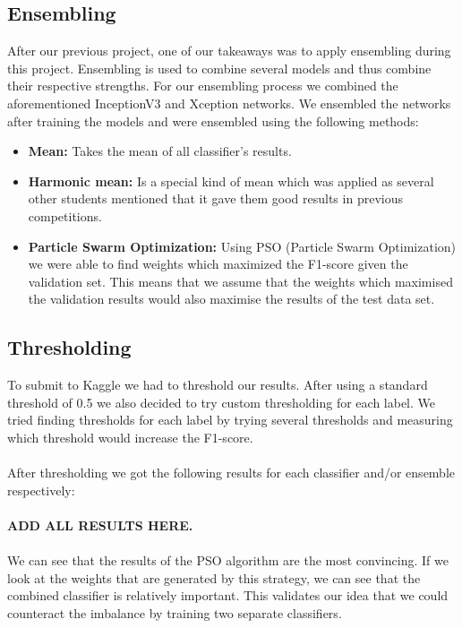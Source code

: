\documentclass[10pt, a4paper]{article}
\begin{document}
\begin{multicols}{2}
		\subsection{Ensembling}
		After our previous project, one of our takeaways was to apply ensembling during this project. Ensembling is used to combine several models and thus combine their respective strengths. For our ensembling process we combined the aforementioned InceptionV3 and Xception networks. We ensembled the networks after training the models and were ensembled using the following methods:
		\begin{itemize}
		    \item \textbf{Mean:} Takes the mean of all classifier's results.
		    \item \textbf{Harmonic mean:} Is a special kind of mean which was applied as several other students mentioned that it gave them good results in previous competitions. 
		    \item \textbf{Particle Swarm Optimization:} Using PSO (Particle Swarm Optimization) we were able to find weights which maximized the F1-score given the validation set. This means that we assume that the weights which maximised the validation results would also maximise the results of the test data set. 
		\end{itemize}

		\subsection{Thresholding}
		To submit to Kaggle we had to threshold our results. After using a standard threshold of 0.5 we also decided to try custom thresholding for each label. We tried finding thresholds for each label by trying several thresholds and measuring which threshold would increase the F1-score.
		\\
		\\
		After thresholding we got the following results for each classifier and/or ensemble respectively:
		\\
		\\
		\textbf{ADD ALL RESULTS HERE.}
		\\
		\\
        We can see that the results of the PSO algorithm are the most convincing. If we look at the weights that are generated by this strategy, we can see that the combined classifier is relatively important. This validates our idea that we could counteract the imbalance by training two separate classifiers.


\end{multicols}
\end{document}
